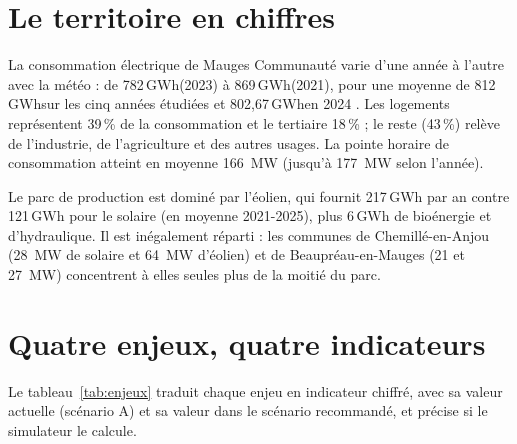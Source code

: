 \documentclass[11pt, a4paper]{report}
\newcommand{\pct}{\,\%}
\newcommand{\gwh}{\,GWh}
\begin{document}
\section{Le territoire en chiffres}

La consommation électrique de Mauges Communauté varie d'une année à l'autre avec la météo : de 782\gwh (2023) à 869\gwh (2021), pour une moyenne de 812\gwh sur les cinq années étudiées et 802,67\gwh en 2024 \cite{odre_conso}. Les logements représentent 39\pct{} de la consommation et le tertiaire 18\pct{} ; le reste (43\pct) relève de l'industrie, de l'agriculture et des autres usages. La pointe horaire de consommation atteint en moyenne 166~MW (jusqu'à 177~MW selon l'année).

Le parc de production est dominé par l'éolien, qui fournit 217\gwh{} par an contre 121\gwh{} pour le solaire (en moyenne 2021-2025), plus 6\gwh{} de bioénergie et d'hydraulique. Il est inégalement réparti : les communes de Chemillé-en-Anjou (28~MW de solaire et 64~MW d'éolien) et de Beaupréau-en-Mauges (21 et 27~MW) concentrent à elles seules plus de la moitié du parc.

\section{Quatre enjeux, quatre indicateurs}

Le tableau~\ref{tab:enjeux} traduit chaque enjeu en indicateur chiffré, avec sa valeur actuelle (scénario A) et sa valeur dans le scénario recommandé, et précise si le simulateur le calcule.

\begin{table}[htbp]
\centering\small
\caption{Les enjeux du territoire comme cahier des charges chiffré.}
\label{tab:enjeux}
\end{table}
\end{document}
